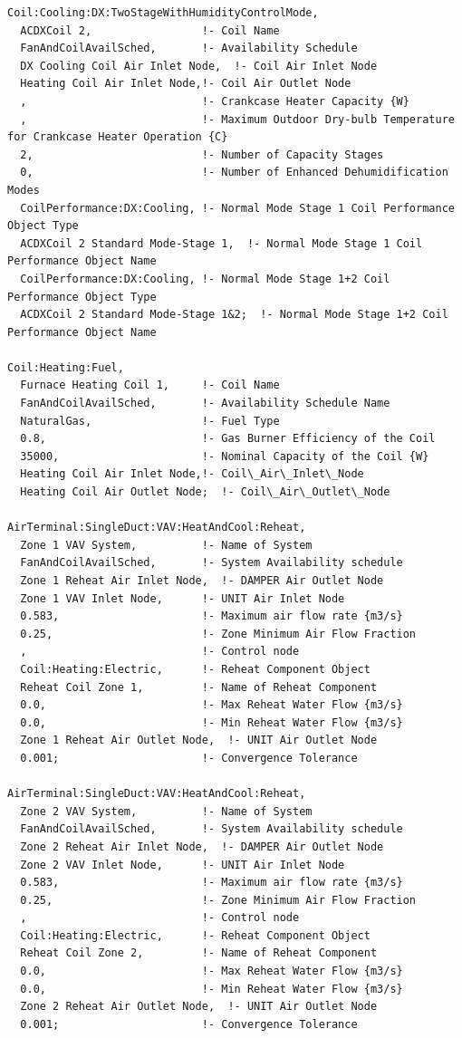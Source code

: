 \begin{lstlisting}
Coil:Cooling:DX:TwoStageWithHumidityControlMode,
  ACDXCoil 2,                 !- Coil Name
  FanAndCoilAvailSched,       !- Availability Schedule
  DX Cooling Coil Air Inlet Node,  !- Coil Air Inlet Node
  Heating Coil Air Inlet Node,!- Coil Air Outlet Node
  ,                           !- Crankcase Heater Capacity {W}
  ,                           !- Maximum Outdoor Dry-bulb Temperature for Crankcase Heater Operation {C}
  2,                          !- Number of Capacity Stages
  0,                          !- Number of Enhanced Dehumidification Modes
  CoilPerformance:DX:Cooling, !- Normal Mode Stage 1 Coil Performance Object Type
  ACDXCoil 2 Standard Mode-Stage 1,  !- Normal Mode Stage 1 Coil Performance Object Name
  CoilPerformance:DX:Cooling, !- Normal Mode Stage 1+2 Coil Performance Object Type
  ACDXCoil 2 Standard Mode-Stage 1&2;  !- Normal Mode Stage 1+2 Coil Performance Object Name

Coil:Heating:Fuel,
  Furnace Heating Coil 1,     !- Coil Name
  FanAndCoilAvailSched,       !- Availability Schedule Name
  NaturalGas,                 !- Fuel Type
  0.8,                        !- Gas Burner Efficiency of the Coil
  35000,                      !- Nominal Capacity of the Coil {W}
  Heating Coil Air Inlet Node,!- Coil\_Air\_Inlet\_Node
  Heating Coil Air Outlet Node;  !- Coil\_Air\_Outlet\_Node

AirTerminal:SingleDuct:VAV:HeatAndCool:Reheat,
  Zone 1 VAV System,          !- Name of System
  FanAndCoilAvailSched,       !- System Availability schedule
  Zone 1 Reheat Air Inlet Node,  !- DAMPER Air Outlet Node
  Zone 1 VAV Inlet Node,      !- UNIT Air Inlet Node
  0.583,                      !- Maximum air flow rate {m3/s}
  0.25,                       !- Zone Minimum Air Flow Fraction
  ,                           !- Control node
  Coil:Heating:Electric,      !- Reheat Component Object
  Reheat Coil Zone 1,         !- Name of Reheat Component
  0.0,                        !- Max Reheat Water Flow {m3/s}
  0.0,                        !- Min Reheat Water Flow {m3/s}
  Zone 1 Reheat Air Outlet Node,  !- UNIT Air Outlet Node
  0.001;                      !- Convergence Tolerance

AirTerminal:SingleDuct:VAV:HeatAndCool:Reheat,
  Zone 2 VAV System,          !- Name of System
  FanAndCoilAvailSched,       !- System Availability schedule
  Zone 2 Reheat Air Inlet Node,  !- DAMPER Air Outlet Node
  Zone 2 VAV Inlet Node,      !- UNIT Air Inlet Node
  0.583,                      !- Maximum air flow rate {m3/s}
  0.25,                       !- Zone Minimum Air Flow Fraction
  ,                           !- Control node
  Coil:Heating:Electric,      !- Reheat Component Object
  Reheat Coil Zone 2,         !- Name of Reheat Component
  0.0,                        !- Max Reheat Water Flow {m3/s}
  0.0,                        !- Min Reheat Water Flow {m3/s}
  Zone 2 Reheat Air Outlet Node,  !- UNIT Air Outlet Node
  0.001;                      !- Convergence Tolerance


\end{lstlisting}
